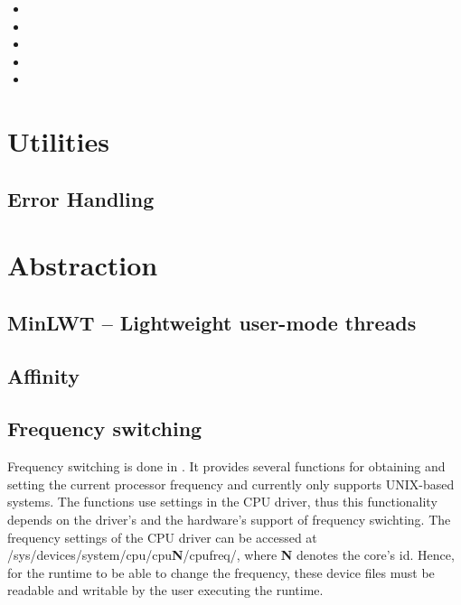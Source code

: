 \begin{itemize} 
	\item {} 
	\item {} 
	\item {} 
	\item {} 
	\item {} 
\end{itemize}


\section{Utilities} 
\subsection{Error Handling} 
\section{Abstraction}
\subsection{MinLWT -- Lightweight user-mode threads} 
\subsection{Affinity}
\subsection{Frequency switching} 

Frequency switching is done in . It provides several functions for obtaining and setting the current processor frequency and currently only supports UNIX-based systems. The functions use settings in the CPU driver, thus this functionality depends on the driver's and the hardware's support of frequency swichting. The frequency settings of the CPU driver can be accessed at /sys/devices/system/cpu/cpu\textbf{N}/cpufreq/, where \textbf{N} denotes the core's id. Hence, for the runtime to be able to change the frequency, these device files must be readable and writable by the user executing the runtime.


